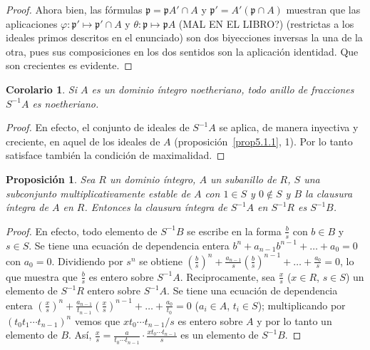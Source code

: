\documentclass[oneside,bibtotoc,leqno,spanish]{amsbook}
\newcommand{\idl}[1]{\mathfrak{#1}}
\newcommand{\QED}{}%
\numberwithin{equation}{section}
\theoremstyle{defi}
\theoremstyle{note}
\newtheorem{proposition}{Proposici\'on}
\newtheorem*{corollary*}{Corolario}
\theoremstyle{rem}
\numberwithin{theorem}{section}
\numberwithin{proposition}{section}
\numberwithin{definition}{section}
\numberwithin{lemma}{section}
\numberwithin{corollary}{section}
\numberwithin{example}{section}
\numberwithin{footnote}{section}%
\begin{document}
\begin{proof}
Ahora bien, las f\'ormulas $\idl{p} = \idl{p}A'\cap A$ y $\idl{p}' = A'(\idl{p}\cap A)$ muestran que
las aplicaciones $\varphi:\idl{p}'\mapsto\idl{p}'\cap A$ y $\theta : \idl{p}\mapsto\idl{p}A$ (MAL EN EL LIBRO?)
(restrictas a los ideales primos descritos en el enunciado) son dos biyecciones inversas la una de la otra, pues sus
composiciones en los dos sentidos son la aplicaci\'on identidad. Que son crecientes es evidente. \QED
\end{proof}

\begin{corollary*}
Si $A$ es un dominio \'integro noetheriano, todo anillo de fracciones $S^{-1}A$ es noetheriano.
\end{corollary*}

\begin{proof}
En efecto, el conjunto de ideales de $S^{-1}A$ se aplica, de manera inyectiva y creciente, en aquel de los
ideales de $A$ (proposici\'on~\ref{prop5.1.1}, 1).
Por lo tanto satisface tambi\'en la condici\'on de maximalidad.
\end{proof}

\begin{proposition}\label{prop5.1.2}
Sea $R$ un dominio \'integro, $A$ un subanillo de $R$, $S$ una subconjunto multiplicativamente estable de $A$ con
$1\in S$ y $0\notin S$ y $B$ la clausura \'integra de $A$ en $R$. Entonces la clausura \'integra de $S^{-1}A$ en
$S^{-1}R$ es $S^{-1}B$.
\end{proposition}

\begin{proof}
En efecto, todo elemento de $S^{-1}B$ se escribe en la forma $\frac{b}{s}$ con $b\in B$ y
$s\in S$. Se tiene una ecuaci\'on de dependencia entera $b^{n}+a_{n-1}b^{n-1}+\dots+a_{0}=0$ con
$a_{0}=0$. Dividiendo por $s^{n}$ se obtiene $\left(\frac{b}{s}\right)^{n}+\frac{a_{n-1}}{s}\left(\frac{b}{s}\right)^{n-1}
+\dots+\frac{a_{0}}{s}=0$, lo que muestra que $\frac{b}{s}$ es entero sobre $S^{-1}A$. Reciprocamente, sea
$\frac{x}{s}$ ($x\in R$, $s\in S$) un elemento de $S^{-1}R$ entero sobre $S^{-1}A$. Se tiene una ecuaci\'on de
dependencia entera $\left(\frac{x}{s}\right)^{n}+\frac{a_{n-1}}{t_{n-1}}\left(\frac{x}{s}\right)^{n-1}+
\dots+\frac{a_{0}}{t_{0}}=0$ ($a_{i}\in A$, $t_{i}\in S$); multiplicando por $(t_{0}t_{1}\cdots t_{n-1})^{n}$
vemos que $xt_{0}\cdots t_{n-1}/s$ es entero sobre $A$ y por lo tanto un elemento de $B$. As\'i,
$\frac{x}{s} = \frac{a}{t_{0}\cdots t_{n-1}}\cdot\frac{xt_{0}\cdots t_{n-1}}{s}$ es un elemento de $S^{-1}B$.
\end{proof}
\end{document}

